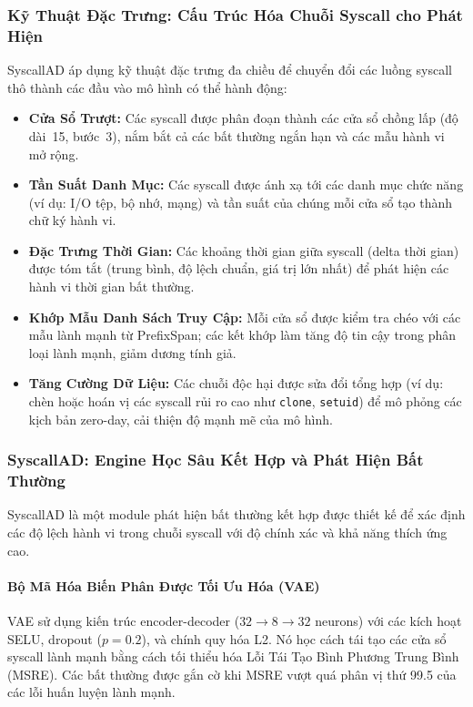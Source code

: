 \subsubsection{Kỹ Thuật Đặc Trưng: Cấu Trúc Hóa Chuỗi Syscall cho Phát Hiện}
\label{subsubsec:features}

SyscallAD áp dụng kỹ thuật đặc trưng đa chiều để chuyển đổi các luồng syscall thô thành các đầu
vào mô hình có thể hành động:

\begin{itemize}
  \item \textbf{Cửa Sổ Trượt:} Các syscall được phân đoạn thành các cửa sổ chồng lấp (độ
        dài~15, bước~3), nắm bắt cả các bất thường ngắn hạn và các mẫu hành vi mở rộng.
  \item \textbf{Tần Suất Danh Mục:} Các syscall được ánh xạ tới các danh mục chức năng (ví dụ:
        I/O tệp, bộ nhớ, mạng) và tần suất của chúng mỗi cửa sổ tạo thành chữ ký hành vi.
  \item \textbf{Đặc Trưng Thời Gian:} Các khoảng thời gian giữa syscall (delta thời gian) được
        tóm tắt (trung bình, độ lệch chuẩn, giá trị lớn nhất) để phát hiện các hành vi thời
        gian bất thường.
  \item \textbf{Khớp Mẫu Danh Sách Truy Cập:} Mỗi cửa sổ được kiểm tra chéo với các mẫu lành
        mạnh từ PrefixSpan; các kết khớp làm tăng độ tin cậy trong phân loại lành mạnh, giảm
        dương tính giả.
  \item \textbf{Tăng Cường Dữ Liệu:} Các chuỗi độc hại được sửa đổi tổng hợp (ví dụ: chèn
        hoặc hoán vị các syscall rủi ro cao như \texttt{clone}, \texttt{setuid}) để mô phỏng
        các kịch bản zero-day, cải thiện độ mạnh mẽ của mô hình.
\end{itemize}

\subsubsection{SyscallAD: Engine Học Sâu Kết Hợp và Phát Hiện Bất Thường}
\label{subsubsec:syscallad}

SyscallAD là một module phát hiện bất thường kết hợp được thiết kế để xác định các độ lệch hành
vi trong chuỗi syscall với độ chính xác và khả năng thích ứng cao.

\paragraph{Bộ Mã Hóa Biến Phân Được Tối Ưu Hóa (VAE)}
VAE sử dụng kiến trúc encoder-decoder ($32 \to 8 \to 32$ neurons) với các kích hoạt SELU,
dropout ($p = 0.2$), và chính quy hóa L2. Nó học cách tái tạo các cửa sổ syscall lành mạnh bằng
cách tối thiểu hóa Lỗi Tái Tạo Bình Phương Trung Bình (MSRE). Các bất thường được gắn cờ khi
MSRE vượt quá phân vị thứ 99.5 của các lỗi huấn luyện lành mạnh.

